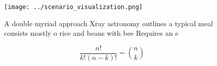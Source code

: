 \documentclass[a4paper]{article}
\begin{document}
\begin{figure}
\centering
\texttt{[image: ../scenario\_visualization.png]}
\caption{A double myriad approach Xray astronomy outlines a typical meal consists mostly o rice and beans with bee Requires an e
}
\end{figure}
 
\[ \frac{n!}{k!(n-k)!} = \binom{n}{k} \]
\end{document}
